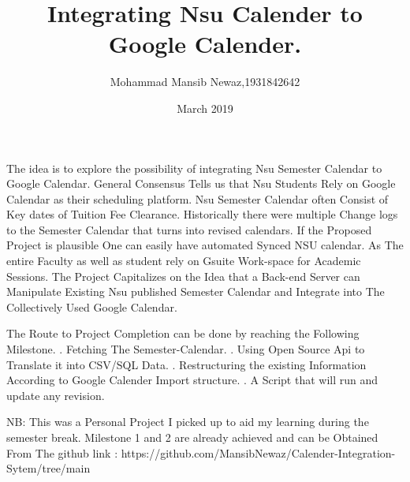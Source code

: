 \documentclass[12pt]{extarticle}
\title{Integrating Nsu Calender to Google Calender.}
\author{Mohammad Mansib Newaz,1931842642}
\date{March 2019}
\begin{document}
\maketitle
The idea is to explore the possibility of integrating Nsu Semester Calendar to Google Calendar. 
General Consensus Tells us that Nsu Students Rely on Google Calendar as their scheduling platform. Nsu Semester Calendar often Consist of Key dates of Tuition Fee Clearance. Historically there were multiple Change logs to the Semester Calendar that turns into revised calendars. If the Proposed Project is plausible One can easily have automated Synced NSU calendar. As The entire Faculty as well as student rely on Gsuite Work-space for Academic Sessions. The Project Capitalizes on the Idea that a Back-end Server can Manipulate Existing Nsu published Semester Calendar and Integrate into The Collectively Used Google Calendar. 

The Route to Project Completion can be done by reaching the Following Milestone. 
\newline \newline
{}. Fetching The Semester-Calendar.
. Using Open Source Api to Translate it into CSV/SQL Data. 
. Restructuring the existing Information According to Google Calender Import structure. 
. A Script that will run and update any revision. 
 

  \newline \newline NB: This was a Personal Project I picked up to aid my learning during the semester break. Milestone 1 and 2 are already achieved and can be Obtained From The github link : https://github.com/MansibNewaz/Calender-Integration-Sytem/tree/main
\end{document}

